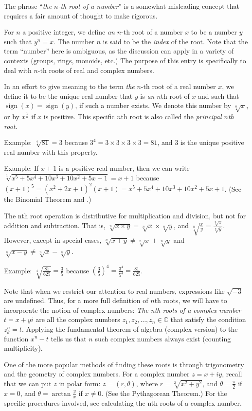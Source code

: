 \documentclass[12pt]{article}
\begin{document}

The phrase ``\emph{the $n$-th root of a number}'' is a somewhat misleading concept that requires a fair amount of thought to make rigorous.

For $n$ a positive integer, we define \emph{an} $n$-th root of a number $x$ to be a number $y$ such that $y^n=x$.  The number $n$ is said to be the \emph{index} of the root.  Note that the term ``number'' here is ambiguous, as the discussion can apply in a variety of contexts (groups, rings, monoids, etc.)  The purpose of this entry is specifically to deal with $n$-th roots of real and complex numbers.

In an effort to give meaning to the term \emph{the} $n$-th root of a real number $x$, we define it to be the unique real number that $y$ is \emph{an} $n$th root of $x$ and such that $\operatorname{sign}(x)=\operatorname{sign}(y)$, if such a number exists.  We denote this number by $\sqrt[n]{x}$, or by $x^{\frac{1}{n}}$ if $x$ is positive.  This specific $n$th root is also called the \emph{principal $n$th root}.

Example:  $\sqrt[4]{81} = 3$ because $3^4 = 3 \times 3 \times 3 \times 3= 81$, and $3$ is the unique positive real number with this property.

Example:  If $x+1$ is a positive real number, then we can write $\sqrt[5]{x^5 + 5x^4 + 10x^3 + 10x^2 + 5x + 1} = x + 1$ because
$(x + 1)^5 = (x^2 + 2x + 1)^2(x + 1) = x^5 + 5x^4 + 10x^3 + 10x^2 + 5x + 1$.  (See the Binomial Theorem
and .)

The nth root operation is distributive for multiplication and division, but not for addition and
subtraction.  That is, $\sqrt[n]{x \times y} = \sqrt[n]{x} \times \sqrt[n]{y}$, and
$\sqrt[n]{\frac{x}{y}} = \frac{\sqrt[n]{x}}{\sqrt[n]{y}}$.  However, except in special cases,
$\sqrt[n]{x + y} \not= \sqrt[n]{x} + \sqrt[n]{y}$ and $\sqrt[n]{x - y} \not= \sqrt[n]{x} - \sqrt[n]{y}$.

Example:  $\sqrt[4]{\frac{81}{625}} = \frac{3}{5}$ because
$\left(\frac{3}{5}\right)^4 = \frac{3^4}{5^4} = \frac{81}{625}$.

Note that when we restrict our attention to real numbers, expressions like $\sqrt{-3}$ are undefined.  Thus, for a more full definition of $n$th roots, we will have to incorporate the notion of complex numbers:  \emph{The nth roots of a complex number} $t = x + yi$ are all the complex numbers $z_1, z_2, \ldots, z_n \in \mathbb{C}$ that satisfy the condition $z_k^n = t$.  Applying the fundamental theorem of algebra (complex version) to the function $x^n-t$ tells us that $n$ such complex numbers always exist (counting multiplicity).

One of the more popular methods of finding these roots is through trigonometry and the geometry of complex numbers.  For a complex number $z=x+iy$, recall that we can put $z$ in polar form:  $z=(r, \theta)$, where $r = \sqrt[2]{x^2 + y^2}$, and $\theta = \frac{\pi}{2}$ if $x = 0$, and $\theta = \arctan{\frac{y}{x}}$ if $x \not= 0$.  (See the Pythagorean Theorem.)  For the specific procedures involved, see calculating the nth roots of a complex number.
\end{document}
